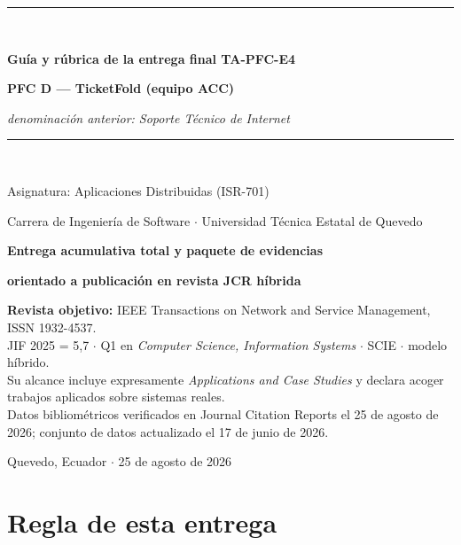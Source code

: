\documentclass[11pt,a4paper]{article}
\begin{document}
\begin{titlepage}
	\centering
	\vspace*{1.2cm}
	{\color{azulUTEQ}\rule{\textwidth}{2pt}}\\[10pt]
	{\LARGE\bfseries\color{azulUTEQ} Guía y rúbrica de la entrega final TA-PFC-E4\par}
	\vspace{8pt}
	{\Large\bfseries\color{azulUTEQ} PFC D --- TicketFold (equipo ACC)\par}
	\vspace{4pt}
	{\normalsize\color{grisTexto}\emph{denominación anterior: Soporte Técnico de Internet}\par}
	\vspace{10pt}
	{\color{azulUTEQ}\rule{\textwidth}{2pt}}\\[16pt]
	{\large Asignatura: Aplicaciones Distribuidas (ISR-701)\par}
	\vspace{4pt}
	{\large Carrera de Ingeniería de Software $\cdot$ Universidad Técnica Estatal de Quevedo\par}
	\vspace{24pt}
	{\large\bfseries Entrega acumulativa total y paquete de evidencias\par}
	{\large\bfseries orientado a publicación en revista JCR híbrida\par}
	\vspace{24pt}
	\begin{minipage}{0.86\textwidth}
		\centering
		\color{grisTexto}
		\small
		\textbf{Revista objetivo:} IEEE Transactions on Network and Service Management, ISSN 1932-4537.\\
		JIF 2025 = 5,7 $\cdot$ Q1 en \emph{Computer Science, Information Systems} $\cdot$ SCIE $\cdot$ modelo híbrido.\\[6pt]
		Su alcance incluye expresamente \emph{Applications and Case Studies} y declara acoger trabajos aplicados sobre sistemas reales.\\[6pt]
		Datos bibliométricos verificados en Journal Citation Reports el 25 de agosto de 2026; conjunto de datos actualizado el 17 de junio de 2026.
	\end{minipage}
	\vfill
	{\small Quevedo, Ecuador $\cdot$ 25 de agosto de 2026\par}
\end{titlepage}

\tableofcontents
\newpage

\section{Regla de esta entrega}
\end{document}
